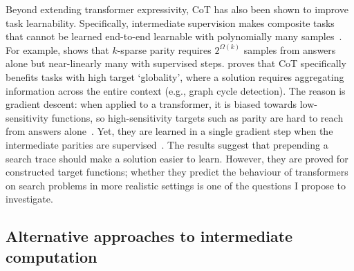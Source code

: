 Beyond extending transformer expressivity, CoT has also been shown to improve task learnability.
Specifically, intermediate supervision makes composite tasks that cannot be learned end-to-end learnable with polynomially many samples~\citep{wiesSubTaskDecompositionEnables2023,malachAutoRegressiveNexttokenPredictors2024,prystawskiWhyThinkStep2023,joshiTheoryLearningAutoregressive2025}.
For example, \citet{wenSparseDependenceSparse2025} shows that $k$-sparse parity requires $2^{\Omega(k)}$ samples from answers alone but near-linearly many with supervised steps.
\citet{abbeHowFarCan2024} proves that CoT specifically benefits tasks with high target `globality', where a solution requires aggregating information across the entire context (e.g., graph cycle detection).
The reason is gradient descent: when applied to a transformer, it is biased towards low-sensitivity functions, so high-sensitivity targets such as parity are hard to reach from answers alone~\citep{hahnWhySensitiveFunctions2024}.
Yet, they are learned in a single gradient step when the intermediate parities are supervised~\citep{kimTransformersProvablySolve2025}.
The results suggest that prepending a search trace should make a solution easier to learn.
However, they are proved for constructed target functions; whether they predict the behaviour of transformers on search problems in more realistic settings is one of the questions I propose to investigate.

\subsection{Alternative approaches to intermediate computation}
\label{sec:bg_reasoning_alternatives}

